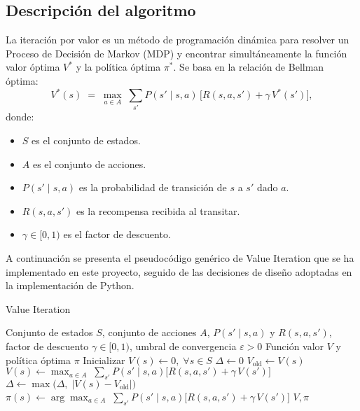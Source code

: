 \subsection{Descripción del algoritmo}

La iteración por valor es un método de programación dinámica para resolver un Proceso de Decisión de Markov (MDP) y encontrar simultáneamente la función valor óptima \(V^*\) y la política óptima \(\pi^*\). Se basa en la relación de Bellman óptima:
\[
V^*(s) \;=\; \max_{a \in A}\;\sum_{s'} P(s' \mid s,a)\,\bigl[R(s,a,s') + \gamma\,V^*(s')\bigr],
\]
donde:
\begin{itemize}
  \item \(S\) es el conjunto de estados.
  \item \(A\) es el conjunto de acciones.
  \item \(P(s'\mid s,a)\) es la probabilidad de transición de \(s\) a \(s'\) dado \(a\).
  \item \(R(s,a,s')\) es la recompensa recibida al transitar.
  \item \(\gamma \in [0,1)\) es el factor de descuento.
\end{itemize}

A continuación se presenta el pseudocódigo genérico de Value Iteration que se ha implementado en este proyecto, seguido de las decisiones de diseño adoptadas en la implementación de Python.

\begin{algorithm}[H]
\caption{Value Iteration}
\begin{algorithmic}[1]
\Require Conjunto de estados $S$, conjunto de acciones $A$, $P(s'\mid s,a)$ y $R(s,a,s')$, factor de descuento $\gamma\in[0,1)$, umbral de convergencia $\varepsilon>0$
\Ensure Función valor $V$ y política óptima $\pi$
\State Inicializar $V(s)\gets 0,\;\forall s\in S$
\Repeat
    \State $\Delta\gets 0$
        \State $V_{\text{old}}\gets V(s)$
        \State $V(s)\gets \max_{a\in A}\;\sum_{s'}P(s'\mid s,a)\bigl[R(s,a,s')+\gamma\,V(s')\bigr]$
        \State $\Delta\gets \max\bigl(\Delta,\;|V(s)-V_{\text{old}}|\bigr)$
    \EndFor
\Until{$\Delta\le\varepsilon$}
    \State $\pi(s)\gets \displaystyle\arg\max_{a\in A}\;\sum_{s'}P(s'\mid s,a)\bigl[R(s,a,s')+\gamma\,V(s')\bigr]$
\EndFor
\State \Return $V,\pi$
\end{algorithmic}
\end{algorithm}

\newpage

